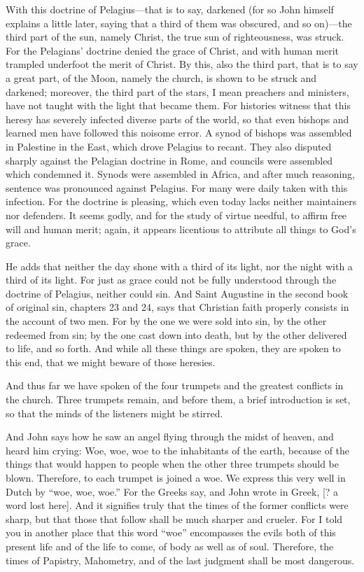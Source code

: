 With this doctrine of Pelagius—that is to say, darkened (for so John himself explains a little later, saying that a third of them was obscured, and so on)—the third part of the sun, namely Christ, the true sun of righteousness, was struck. For the Pelagians' doctrine denied the grace of Christ, and with human merit trampled underfoot the merit of Christ. By this, also the third part, that is to say a great part, of the Moon, namely the church, is shown to be struck and darkened; moreover, the third part of the stars, I mean preachers and ministers, have not taught with the light that became them. For histories witness that this heresy has severely infected diverse parts of the world, so that even bishops and learned men have followed this noisome error. A synod of bishops was assembled in Palestine in the East, which drove Pelagius to recant. They also disputed sharply against the Pelagian doctrine in Rome, and councils were assembled which condemned it. Synods were assembled in Africa, and after much reasoning, sentence was pronounced against Pelagius. For many were daily taken with this infection. For the doctrine is pleasing, which even today lacks neither maintainers nor defenders. It seems godly, and for the study of virtue needful, to affirm free will and human merit; again, it appears licentious to attribute all things to God’s grace.

He adds that neither the day shone with a third of its light, nor the night with a third of its light. For just as grace could not be fully understood through the doctrine of Pelagius, neither could sin. And Saint Augustine in the second book of original sin, chapters 23 and 24, says that Christian faith properly consists in the account of two men. For by the one we were sold into sin, by the other redeemed from sin; by the one cast down into death, but by the other delivered to life, and so forth. And while all these things are spoken, they are spoken to this end, that we might beware of those heresies.

And thus far we have spoken of the four trumpets and the greatest conflicts in the church. Three trumpets remain, and before them, a brief introduction is set, so that the minds of the listeners might be stirred.

And John says how he saw an angel flying through the midst of heaven, and heard him crying: Woe, woe, woe to the inhabitants of the earth, because of the things that would happen to people when the other three trumpets should be blown. Therefore, to each trumpet is joined a woe. We express this very well in Dutch by “woe, woe, woe.” For the Greeks say, and John wrote in Greek, [? \textup{a word lost here}]. And it signifies truly that the times of the former conflicts were sharp, but that those that follow shall be much sharper and crueler. For I told you in another place that this word “woe” encompasses the evils both of this present life and of the life to come, of body as well as of soul. Therefore, the times of Papistry, Mahometry, and of the last judgment shall be most dangerous.

